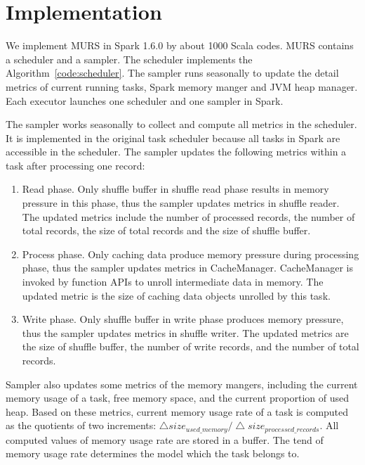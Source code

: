 \section{Implementation}

We implement MURS in Spark 1.6.0 by about 1000 Scala codes. MURS contains a scheduler and a sampler. The scheduler implements the Algorithm~\ref{code:scheduler}. The sampler runs seasonally to update the detail metrics of current running tasks, Spark memory manger and JVM heap manager. Each executor launches one scheduler and one sampler in Spark.

The sampler works seasonally to collect and compute all metrics in the scheduler. It is implemented in the original task scheduler because all tasks in Spark are accessible in the scheduler. The sampler updates the following metrics within a task after processing one record:

\begin{enumerate}

\item Read phase. Only shuffle buffer in shuffle read phase results in memory pressure in this phase, thus the sampler updates metrics in shuffle reader. The updated metrics include the number of processed records, the number of total records, the size of total records and the size of shuffle buffer.

\item Process phase. Only caching data produce memory pressure during processing phase, thus the sampler updates metrics in {\ttfamily \small CacheManager}. {\ttfamily \small CacheManager} is invoked by function APIs to unroll intermediate data in memory. The updated metric is the size of caching data objects unrolled by this task.

\item Write phase. Only shuffle buffer in write phase produces memory pressure, thus the sampler updates metrics in shuffle writer. The updated metrics are the size of shuffle buffer, the number of write records, and the number of total records. 

\end{enumerate}

Sampler also updates some metrics of the memory mangers, including the current memory usage of a task, free memory space, and the current proportion of used heap. Based on these metrics, current memory usage rate of a task is computed as the quotients of two increments: $\bigtriangleup size_{used\_memory} / \bigtriangleup size_{processed\_records}$. All computed values of memory usage rate are stored in a buffer. The tend of memory usage rate determines the model which the task belongs to. 

